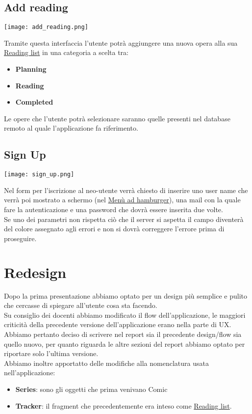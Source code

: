 \documentclass[../Assignment-3-LPSMT.tex]{subfiles}
\begin{document}
\subsection{Add reading}

\begin{center}
   \texttt{[image: add\_reading.png]}
\end{center}

Tramite questa interfaccia l'utente potrà aggiungere una nuova opera alla sua \hyperref[sec:reading_list]{Reading list} in una categoria a scelta tra:
\begin{itemize}
   \item \textbf{Planning}
   \item \textbf{Reading}
   \item \textbf{Completed}
\end{itemize}
Le opere che l'utente potrà selezionare saranno quelle presenti nel database remoto al quale l'applicazione fa riferimento.

\subsection{Sign Up}

\begin{center}
   \texttt{[image: sign\_up.png]}
\end{center}

Nel form per l'iscrizione al neo-utente verrà chiesto di inserire uno user name che verrà poi mostrato a schermo (nel \hyperref[sec:hamburger]{Menù ad hamburger}), una mail con la quale fare la autenticazione e una password che dovrà essere inserita due volte.\\
Se uno dei parametri non rispetta ciò che il server si aspetta il campo diventerà del colore assegnato agli errori e non si dovrà correggere l'errore prima di proseguire.

\section{Redesign}

Dopo la prima presentazione abbiamo optato per un design più semplice e pulito che cercasse di spiegare all'utente cosa sta facendo.\\
Su consiglio dei docenti abbiamo modificato il flow dell'applicazione, le maggiori criticità della precedente versione dell'applicazione erano nella parte di UX.\\
Abbiamo pertanto deciso di scrivere nel report  sia il precedente design/flow sia quello nuovo, per quanto riguarda le altre sezioni del report abbiamo optato per riportare solo l'ultima versione.\\
Abbiamo inoltre apportatto delle modifiche alla nomenclatura usata nell'applicazione:
\begin{itemize}
  \item \textbf{Series}: sono gli oggetti che prima venivano Comic
  \item \textbf{Tracker}: il fragment che precedentemente era inteso come \hyperref[sec:reading_list]{Reading list}.
\end{itemize}
\end{document}
